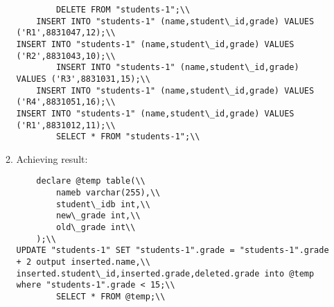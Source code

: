 \documentclass{article}
\begin{document}
\begin{enumerate}
\begin{enumerate}
	\begin{verbatim}
		DELETE FROM "students-1";\\
	INSERT INTO "students-1" (name,student\_id,grade) VALUES ('R1',8831047,12);\\
INSERT INTO "students-1" (name,student\_id,grade) VALUES ('R2',8831043,10);\\
		INSERT INTO "students-1" (name,student\_id,grade) VALUES ('R3',8831031,15);\\
	INSERT INTO "students-1" (name,student\_id,grade) VALUES ('R4',8831051,16);\\
INSERT INTO "students-1" (name,student\_id,grade) VALUES ('R1',8831012,11);\\
		SELECT * FROM "students-1";\\
\end{verbatim}
\item Achieving result:

	
	\begin{verbatim}
	declare @temp table(\\
		nameb varchar(255),\\
		student\_idb int,\\
		new\_grade int,\\
		old\_grade int\\
	);\\
UPDATE "students-1" SET "students-1".grade = "students-1".grade + 2 output inserted.name,\\
inserted.student\_id,inserted.grade,deleted.grade into @temp where "students-1".grade < 15;\\
		SELECT * FROM @temp;\\
\end{verbatim}
	\end{enumerate}
\end{enumerate}
\end{document}
